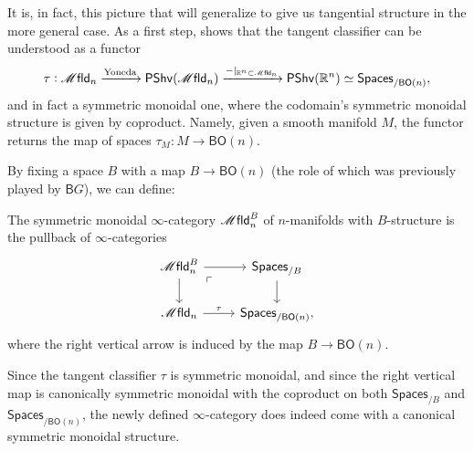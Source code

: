 \documentclass[../text]{subfiles}
\begin{document}
It is, in fact, this picture that will generalize to give us tangential structure in the more general case. As a first step, \cite[cor.2.13]{af_fhtop} shows that the tangent classifier can be understood as a functor
%
\begin{equation}
    \tau: \mfld_n \xrightarrow{\mathrm{Yoneda}} \mathsf{PShv}(\mfld_n) \xrightarrow{-|_{\mathbb{R}^n \subset \mfld_n}} \mathsf{PShv}(\mathbb{R}^n) \simeq \mathsf{Spaces}_{/\mathsf{BO}(n)},
\end{equation}
%
and in fact a symmetric monoidal one, where the codomain's symmetric monoidal structure is given by coproduct. Namely, given a smooth manifold $M$, the functor returns the map of spaces $\tau_M:M \rightarrow \mathsf{BO}(n)$.

By fixing a space $B$ with a map $B \rightarrow \mathsf{BO}(n)$ (the role of which was previously played by $\mathsf{B}G$), we can define:
%
\begin{definition}
    The symmetric monoidal $\infty$-category $\mfld_n^B$ of $n$-manifolds with $B$-structure is the pullback of $\infty$-categories
    \begin{equation}
        \begin{tikzcd}
            \mfld_n^B \arrow[dr, phantom, "\ulcorner", very near start] \arrow[r] \arrow[d] & \mathsf{Spaces}_{/B} \arrow[d] \\
            \mfld_n \arrow[r, "\tau"] & \mathsf{Spaces}_{/\mathsf{BO}(n)},
        \end{tikzcd}
    \end{equation}
    where the right vertical arrow is induced by the map $B \rightarrow \mathsf{BO}(n)$.
\end{definition}

\begin{remark}
    Since the tangent classifier $\tau$ is symmetric monoidal, and since the right vertical map is canonically symmetric monoidal with the coproduct on both $\mathsf{Spaces}_{/B}$ and $\mathsf{Spaces}_{/\mathsf{BO}(n)}$, the newly defined $\infty$-category does indeed come with a canonical symmetric monoidal structure.
\end{remark}
\end{document}
